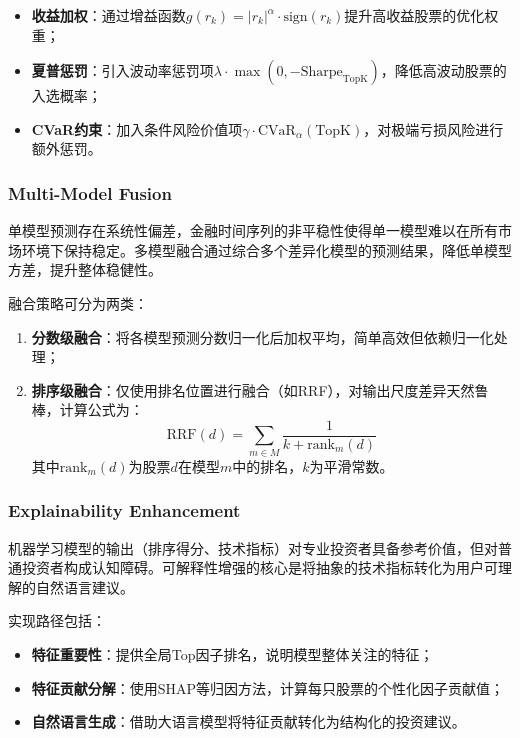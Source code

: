 \documentclass[11pt,a4paper]{ctexart}
\begin{document}
\begin{itemize}
    \item \textbf{收益加权}：通过增益函数$g(r_k) = |r_k|^{\alpha} \cdot \text{sign}(r_k)$提升高收益股票的优化权重；
    \item \textbf{夏普惩罚}：引入波动率惩罚项$\lambda \cdot \max(0, -\text{Sharpe}_{\text{TopK}})$，降低高波动股票的入选概率；
    \item \textbf{CVaR约束}：加入条件风险价值项$\gamma \cdot \text{CVaR}_{\alpha}(\text{TopK})$，对极端亏损风险进行额外惩罚。
\end{itemize}

\subsubsection{Multi-Model Fusion}
\label{subsec:fusion}

单模型预测存在系统性偏差，金融时间序列的非平稳性使得单一模型难以在所有市场环境下保持稳定。多模型融合通过综合多个差异化模型的预测结果，降低单模型方差，提升整体稳健性。

融合策略可分为两类：

\begin{enumerate}
    \item \textbf{分数级融合}：将各模型预测分数归一化后加权平均，简单高效但依赖归一化处理；
    \item \textbf{排序级融合}：仅使用排名位置进行融合（如RRF），对输出尺度差异天然鲁棒，计算公式为：
    \begin{equation}
    \text{RRF}(d) = \sum_{m \in M} \frac{1}{k + \text{rank}_m(d)}
    \label{eq:rrf}
    \end{equation}
    其中$\text{rank}_m(d)$为股票$d$在模型$m$中的排名，$k$为平滑常数。
\end{enumerate}

\subsubsection{Explainability Enhancement}
\label{subsec:explainability}

机器学习模型的输出（排序得分、技术指标）对专业投资者具备参考价值，但对普通投资者构成认知障碍。可解释性增强的核心是将抽象的技术指标转化为用户可理解的自然语言建议。

实现路径包括：
\begin{itemize}
    \item \textbf{特征重要性}：提供全局Top因子排名，说明模型整体关注的特征；
    \item \textbf{特征贡献分解}：使用SHAP等归因方法，计算每只股票的个性化因子贡献值；
    \item \textbf{自然语言生成}：借助大语言模型将特征贡献转化为结构化的投资建议。
\end{itemize}
\end{document}
